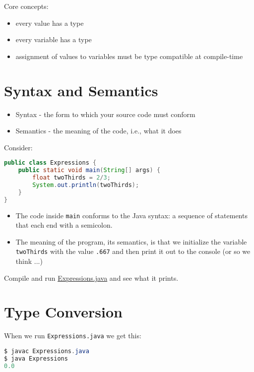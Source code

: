 \documentclass{article}
\begin{document}
Core concepts:
\begin{itemize}
\item every value has a type
\item every variable has a type
\item assignment of values to variables must be type compatible at compile-time
\end{itemize}





\section{Syntax and Semantics}


\begin{itemize}
\item Syntax - the form to which your source code must conform
\item Semantics - the meaning of the code, i.e., what it does
\end{itemize}
Consider:
\begin{lstlisting}[language=Java]
public class Expressions {
    public static void main(String[] args) {
        float twoThirds = 2/3;
        System.out.println(twoThirds);
    }
}
\end{lstlisting}

\begin{itemize}
\item The code inside {\tt main} conforms to the Java syntax: a sequence of statements that each end with a semicolon.
\item The meaning of the program, its semantics, is that we initialize the variable {\tt twoThirds} with the value {\tt .667} and then print it out to the console (or so we think ...)
\end{itemize}

Compile and run \href{\code/basics/Expressions.java}{Expressions.java} and see what it prints.




\section{Type Conversion}


When we run {\tt Expressions.java} we get this:
\begin{lstlisting}[language=Java]
$ javac Expressions.java
$ java Expressions
0.0
\end{lstlisting}
\end{document}
